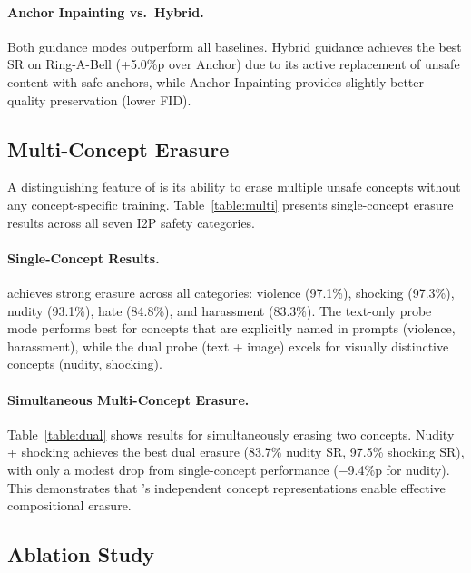 \paragraph{Anchor Inpainting vs.\ Hybrid.}
Both guidance modes outperform all baselines. Hybrid guidance achieves the best SR on Ring-A-Bell (+5.0\%p over Anchor) due to its active replacement of unsafe content with safe anchors, while Anchor Inpainting provides slightly better quality preservation (lower FID).

\subsection{Multi-Concept Erasure}
\label{subsec:multi_results}

A distinguishing feature of \ours{} is its ability to erase multiple unsafe concepts without any concept-specific training. Table~\ref{table:multi} presents single-concept erasure results across all seven I2P safety categories.



\paragraph{Single-Concept Results.}
\ours{} achieves strong erasure across all categories: violence (97.1\%), shocking (97.3\%), nudity (93.1\%), hate (84.8\%), and harassment (83.3\%). The text-only probe mode performs best for concepts that are explicitly named in prompts (violence, harassment), while the dual probe (text + image) excels for visually distinctive concepts (nudity, shocking).

\paragraph{Simultaneous Multi-Concept Erasure.}
Table~\ref{table:dual} shows results for simultaneously erasing two concepts. Nudity + shocking achieves the best dual erasure (83.7\% nudity SR, 97.5\% shocking SR), with only a modest drop from single-concept performance ($-$9.4\%p for nudity). This demonstrates that \ours{}'s independent concept representations enable effective compositional erasure.



\subsection{Ablation Study}
\label{subsec:ablation}

